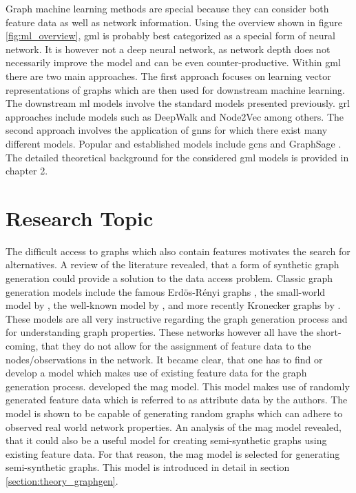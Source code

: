 	\noindent Graph machine learning methods are special because they can 
	consider both feature data as well as network information. Using the
	overview shown in figure \ref{fig:ml_overview}, \acs{gml} is probably best 
	categorized as a special form of neural network. It is however not a deep 
	neural network, as network depth does not necessarily improve the model and 
	can be even counter-productive. Within \acs{gml} there are two main 
	approaches. The first approach focuses on learning vector representations of 
	graphs which are then used for downstream machine learning. The downstream 
	\acs{ml} models involve the standard models presented previously. 
	\Ac{grl} approaches include models such as DeepWalk 
	\citep{perozzi2014deepwalk} and Node2Vec \citep{grover2016node2vec} among 
	others. The second approach involves the application of \acp{gnn} for which 
	there exist many different models. Popular and established models include 
	\acp{gcn} \citep{kipf2016semi} and GraphSage \citep{hamilton2017inductive}. 
	The detailed theoretical background for the considered \acs{gml} models is 
	provided in chapter 2.

	\section{Research Topic}
	\label{section:research_topics}

	\noindent The difficult access to graphs which also contain features 
	motivates the search for alternatives. A review of the literature revealed, 
	that a form of synthetic graph generation could provide a solution to the data 
	access problem. Classic graph generation models include the famous 
	Erdös-Rényi graphs \citeyearpar{erdos1959random}, the small-world model by 
	\cite{watts1998collective}, the well-known model by 
	\cite{barabasi1999emergence}, and more recently Kronecker graphs by
	\cite{leskovec2010kronecker}. These models are all very instructive
	regarding the graph generation process and for understanding graph
	properties. These networks however all have the short-coming, that they do 
	not allow for the assignment of feature data to the nodes/observations in the
	network. It became clear, that one has to find or develop a model which 
	makes use of existing feature data for the graph generation process. 
	\cite{kim2012multiplicative} developed the \ac{mag} model. This model makes 
	use of randomly generated feature data which is referred to as attribute data 
	by the authors. The model is shown to be capable of generating random graphs 
	which can adhere to observed real world network properties. An analysis of 
	the \ac{mag} model revealed, that it could also be a useful model for 
	creating semi-synthetic graphs using existing feature data. For that reason, 
	the \acs{mag} model is selected for generating semi-synthetic graphs. This 
	model is introduced in detail in section \ref{section:theory_graphgen}. \\

